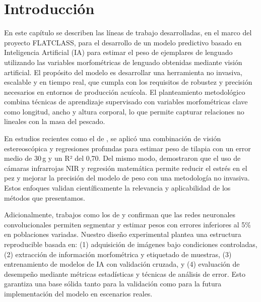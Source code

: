 \documentclass[a4paper,10pt,spanish]{jupyterBook}
\begin{document}
\section{Introducción}
\label{\detokenize{content/03/Peso:introduccion}}
\sphinxAtStartPar
En este capítulo se describen las líneas de trabajo desarrolladas, en el marco del proyecto FLATCLASS, para el desarrollo de un modelo predictivo basado en Inteligencia Artificial (IA) para estimar el peso de ejemplares de lenguado utilizando las variables morfométricas de lenguado obtenidas mediante visión artificial. El propósito del modelo es desarrollar una herramienta no invasiva, escalable y en tiempo real, que cumpla con los requisitos de robustez y precisión necesarios en entornos de producción acuícola. El planteamiento metodológico combina técnicas de aprendizaje supervisado con variables morfométricas clave como longitud, ancho y altura corporal, lo que permite capturar relaciones no lineales con la masa del pescado.

\sphinxAtStartPar
En estudios recientes como el de , se aplicó una combinación de visión estereoscópica y regresiones profundas para estimar peso de tilapia con un error medio de 30 g y un R² del 0,70. Del mismo modo,  demostraron que el uso de cámaras infrarrojas NIR y regresión matemática permite reducir el estrés en el pez y mejorar la precisión del modelo de peso con una metodología no invasiva. Estos enfoques validan científicamente la relevancia y aplicabilidad de los métodos que presentamos.

\sphinxAtStartPar
Adicionalmente, trabajos como los de  y  confirman que las redes neuronales convolucionales permiten segmentar y estimar pesos con errores inferiores al 5\% en poblaciones variadas. Nuestro diseño experimental plantea una estructura reproducible basada en: (1) adquisición de imágenes bajo condiciones controladas, (2) extracción de información morfométrica y etiquetado de muestras, (3) entrenamiento de modelos de IA con validación cruzada, y (4) evaluación de desempeño mediante métricas estadísticas y técnicas de análisis de error. Esto garantiza una base sólida tanto para la validación como para la futura implementación del modelo en escenarios reales.

\sphinxstepscope
\end{document}
